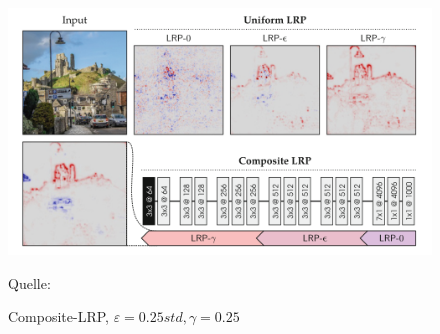 \documentclass[11pt,a4paper]{article}
\newcommand{\source}[1]{\caption*{\hfill Quelle: {#1}} }
\numberwithin{equation}{section}
\begin{document}
	\begin{figure}[ht]
		\centering
		\includegraphics[width=0.3\textheight]{composite_lrp.png}
		\caption[Composite-LRP]{Composite-LRP, $\varepsilon=0.25std, \gamma=0.25$}
		\source{\cite{samek2019explainable}}
		\label{im:composite_lrp}
	\end{figure}
	
\end{document}
